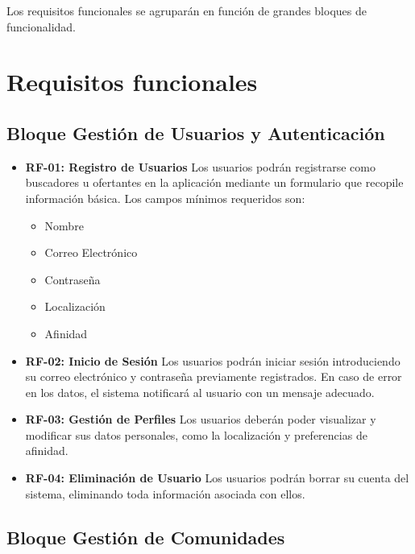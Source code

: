 Los requisitos funcionales se agruparán en función de grandes bloques de funcionalidad.

\section{Requisitos funcionales}

\subsection{Bloque Gestión de Usuarios y Autenticación}

\begin{itemize}
    \item \textbf{RF-01: Registro de Usuarios}  
    Los usuarios podrán registrarse como buscadores u ofertantes en la aplicación mediante un formulario que recopile información básica. Los campos mínimos requeridos son:
    \begin{itemize}
        \item Nombre
        \item Correo Electrónico
        \item Contraseña
        \item Localización
        \item Afinidad
    \end{itemize}
    
    \item \textbf{RF-02: Inicio de Sesión}  
    Los usuarios podrán iniciar sesión introduciendo su correo electrónico y contraseña previamente registrados.  
    En caso de error en los datos, el sistema notificará al usuario con un mensaje adecuado.
    
    \item \textbf{RF-03: Gestión de Perfiles}  
    Los usuarios deberán poder visualizar y modificar sus datos personales, como la localización y preferencias de afinidad.

    \item \textbf{RF-04: Eliminación de Usuario}
    Los usuarios podrán borrar su cuenta del sistema, eliminando toda información asociada con ellos.
\end{itemize}

\subsection{Bloque Gestión de Comunidades}

